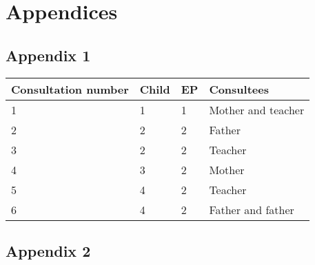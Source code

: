 \documentclass[
]{article}
\begin{document}
\hypertarget{appendices}{%
\section{Appendices}\label{appendices}}

\hypertarget{appendix-1}{%
\subsection{Appendix 1}\label{appendix-1}}

\begin{longtable}[]{@{}llll@{}}
\toprule
Consultation number & Child & EP & Consultees \\
\midrule
\endhead
1 & 1 & 1 & Mother and teacher \\
2 & 2 & 2 & Father \\
3 & 2 & 2 & Teacher \\
4 & 3 & 2 & Mother \\
5 & 4 & 2 & Teacher \\
6 & 4 & 2 & Father and father \\
\bottomrule
\end{longtable}

\hypertarget{appendix-2}{%
\subsection{Appendix 2}\label{appendix-2}}
\end{document}
